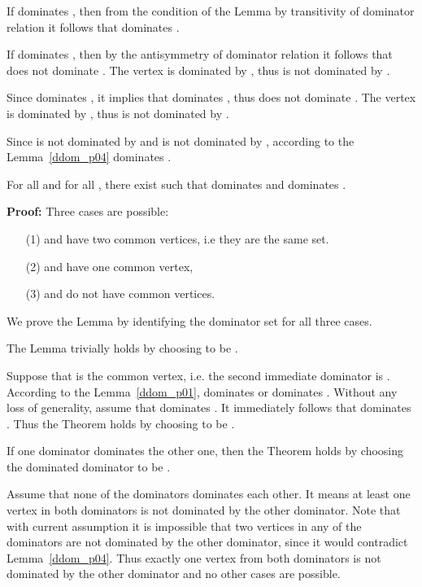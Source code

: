 \documentclass{llncs}
\begin{document}
If  dominates , then from the condition of the Lemma by transitivity of
dominator relation it follows that  dominates .

If  dominates , then by the antisymmetry of
dominator relation it follows that  does not dominate
. The vertex  is dominated by , thus
 is not dominated by .

Since  dominates , it implies that  dominates
, thus  does not dominate . The
vertex  is dominated by , thus  is not
dominated by .

Since  is not dominated by  and  is not
dominated by , according to the Lemma~\ref{ddom_p04} 
dominates .
\begin{flushright}

\end{flushright}




\begin{lemma} \label{ddom_p05}
For all  and for all , there exist  such that 
dominates  and  dominates .
\end{lemma}
{\bf Proof:}
Three cases are possible:
\begin{itemize}
\item[(1)]  and  have two common
vertices, i.e they are the same set.
\item[(2)]  and  have one common
vertex,
\item[(3)]  and  do not have common
vertices.
\end{itemize}

We prove the Lemma by identifying the dominator set 
for all three cases.

The Lemma trivially holds by choosing  to be .

Suppose that  is the common vertex, i.e. the second immediate
dominator is . According to the Lemma~\ref{ddom_p01}, 
dominates  or  dominates . Without any loss of
generality, assume that  dominates . It immediately
follows that  dominates . Thus the Theorem
holds by choosing  to be .

If one dominator dominates the other one, then the Theorem holds by
choosing the dominated dominator to be .

Assume that none of the dominators dominates each other. It means at
least one vertex in both dominators is not dominated by the other
dominator.  Note that with current assumption it is impossible that
two vertices in any of the dominators are not dominated by the other
dominator, since it would contradict Lemma~\ref{ddom_p04}. Thus exactly
one vertex from both dominators is not dominated by the other dominator
and no other cases are possible.
\end{document}
